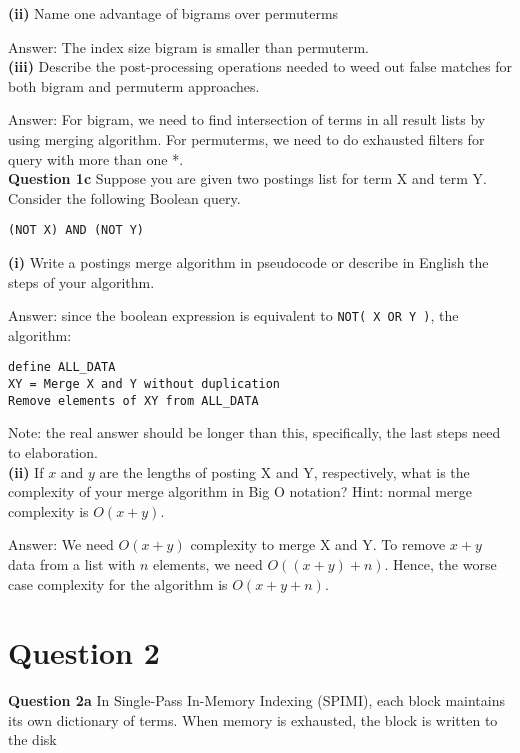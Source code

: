 \documentclass[11pt,a4paper]{report}
\begin{document}
\begin{multicols*}{2}
\noindent \textbf{(ii)} Name one advantage of bigrams over permuterms

\noindent Answer: The index size bigram is smaller than permuterm.\\

\noindent \textbf{(iii)} Describe the post-processing operations needed to weed out false matches for both bigram and permuterm approaches.

\noindent Answer: For bigram, we need to find intersection of terms in all result lists by using merging algorithm. For permuterms, we need to do exhausted filters for query with more than one *.\\

\noindent \textbf{Question 1c} Suppose you are given two postings list for term X and term Y. Consider the following Boolean query.

\begin{center}
\verb|(NOT X) AND (NOT Y)|
\end{center}

\noindent \textbf{(i)} Write a postings merge algorithm in pseudocode or describe in English the steps of your algorithm.

\noindent Answer: since the boolean expression is equivalent to \verb|NOT( X OR Y )|, the algorithm:

\begin{lstlisting}
define ALL_DATA
XY = Merge X and Y without duplication
Remove elements of XY from ALL_DATA
\end{lstlisting}

\noindent Note: the real answer should be longer than this, specifically, the last steps need to elaboration. \\

\noindent \textbf{(ii)} If $x$ and $y$ are the lengths of posting X and Y, respectively, what is the complexity of your merge algorithm in Big O notation? Hint: normal merge complexity is $O(x+y)$.

\noindent Answer: We need $O(x+y)$ complexity to merge X and Y. To remove $x+y$ data from a list with $n$ elements, we need $O((x+y)+n)$. Hence, the worse case complexity for the algorithm is $O(x+y+n)$.

\section{Question 2}

\noindent \textbf{Question 2a} In Single-Pass In-Memory Indexing (SPIMI), each block maintains its own dictionary of terms. When memory is exhausted, the block is written to the disk\\


\end{multicols*}
\end{document}

